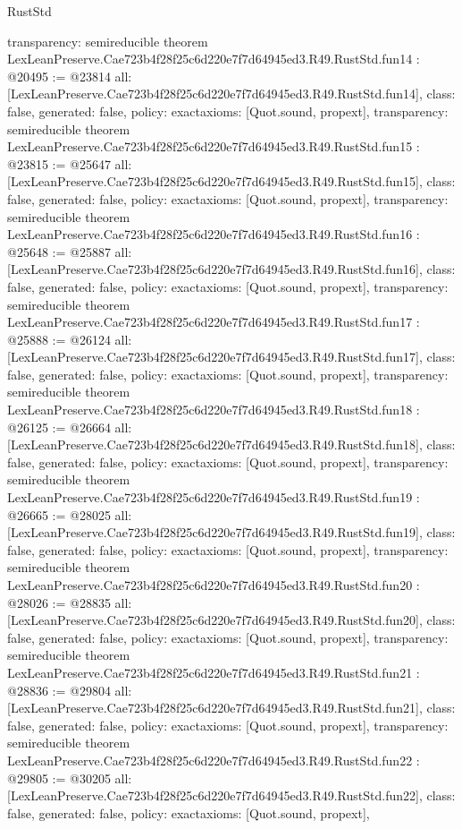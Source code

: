 \begin{lexlean}{RustStd}
\begin{coremodule}
{  transparency: semireducible
}
theorem LexLeanPreserve.Cae723b4f28f25c6d220e7f7d64945ed3.R49.RustStd.fun14 : @20495 := @23814 {
  all: [LexLeanPreserve.Cae723b4f28f25c6d220e7f7d64945ed3.R49.RustStd.fun14],
  class: false,
  generated: false,
  policy: exact{axioms: [Quot.sound, propext]},
  transparency: semireducible
}
theorem LexLeanPreserve.Cae723b4f28f25c6d220e7f7d64945ed3.R49.RustStd.fun15 : @23815 := @25647 {
  all: [LexLeanPreserve.Cae723b4f28f25c6d220e7f7d64945ed3.R49.RustStd.fun15],
  class: false,
  generated: false,
  policy: exact{axioms: [Quot.sound, propext]},
  transparency: semireducible
}
theorem LexLeanPreserve.Cae723b4f28f25c6d220e7f7d64945ed3.R49.RustStd.fun16 : @25648 := @25887 {
  all: [LexLeanPreserve.Cae723b4f28f25c6d220e7f7d64945ed3.R49.RustStd.fun16],
  class: false,
  generated: false,
  policy: exact{axioms: [Quot.sound, propext]},
  transparency: semireducible
}
theorem LexLeanPreserve.Cae723b4f28f25c6d220e7f7d64945ed3.R49.RustStd.fun17 : @25888 := @26124 {
  all: [LexLeanPreserve.Cae723b4f28f25c6d220e7f7d64945ed3.R49.RustStd.fun17],
  class: false,
  generated: false,
  policy: exact{axioms: [Quot.sound, propext]},
  transparency: semireducible
}
theorem LexLeanPreserve.Cae723b4f28f25c6d220e7f7d64945ed3.R49.RustStd.fun18 : @26125 := @26664 {
  all: [LexLeanPreserve.Cae723b4f28f25c6d220e7f7d64945ed3.R49.RustStd.fun18],
  class: false,
  generated: false,
  policy: exact{axioms: [Quot.sound, propext]},
  transparency: semireducible
}
theorem LexLeanPreserve.Cae723b4f28f25c6d220e7f7d64945ed3.R49.RustStd.fun19 : @26665 := @28025 {
  all: [LexLeanPreserve.Cae723b4f28f25c6d220e7f7d64945ed3.R49.RustStd.fun19],
  class: false,
  generated: false,
  policy: exact{axioms: [Quot.sound, propext]},
  transparency: semireducible
}
theorem LexLeanPreserve.Cae723b4f28f25c6d220e7f7d64945ed3.R49.RustStd.fun20 : @28026 := @28835 {
  all: [LexLeanPreserve.Cae723b4f28f25c6d220e7f7d64945ed3.R49.RustStd.fun20],
  class: false,
  generated: false,
  policy: exact{axioms: [Quot.sound, propext]},
  transparency: semireducible
}
theorem LexLeanPreserve.Cae723b4f28f25c6d220e7f7d64945ed3.R49.RustStd.fun21 : @28836 := @29804 {
  all: [LexLeanPreserve.Cae723b4f28f25c6d220e7f7d64945ed3.R49.RustStd.fun21],
  class: false,
  generated: false,
  policy: exact{axioms: [Quot.sound, propext]},
  transparency: semireducible
}
theorem LexLeanPreserve.Cae723b4f28f25c6d220e7f7d64945ed3.R49.RustStd.fun22 : @29805 := @30205 {
  all: [LexLeanPreserve.Cae723b4f28f25c6d220e7f7d64945ed3.R49.RustStd.fun22],
  class: false,
  generated: false,
  policy: exact{axioms: [Quot.sound, propext]},
}
\end{coremodule}
\end{lexlean}

